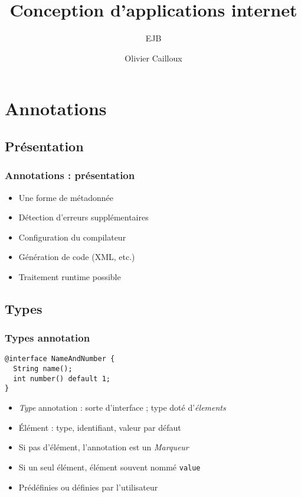 \documentclass[english, french]{beamer}
\title{Conception d’applications internet}
\subtitle{EJB}
\author{Olivier Cailloux}
\institute[LAMSADE]{LAMSADE, Université Paris-Dauphine}
\date{\formatdate{14}{12}{2015}}
\begin{document}


\begin{frame}[plain]
   \titlepage
\end{frame}
\addtocounter{framenumber}{-1}

\section{Annotations}
\subsection{Présentation}
\begin{frame}
	\frametitle{Annotations : présentation}
	\begin{itemize}
		\item Une forme de métadonnée
		\item Détection d’erreurs supplémentaires
		\item Configuration du compilateur
		\item Génération de code (XML, etc.)
		\item Traitement runtime possible
	\end{itemize}
\end{frame}

\subsection{Types}
\begin{frame}[fragile]
	\frametitle{Types annotation}
	\begin{lstlisting}
@interface NameAndNumber {
  String name();
  int number() default 1;
}
	\end{lstlisting}
	\begin{itemize}
		\item \emph{Type} annotation : sorte d’interface ; type doté d’\emph{élements}
		\item Élément : type, identifiant, valeur par défaut
		\item Si pas d’élément, l’annotation est un \emph{Marqueur}
		\item Si un seul élément, élément souvent nommé \texttt{value}
		\item Prédéfinies ou définies par l’utilisateur
	\end{itemize}
\end{frame}
\end{document}
